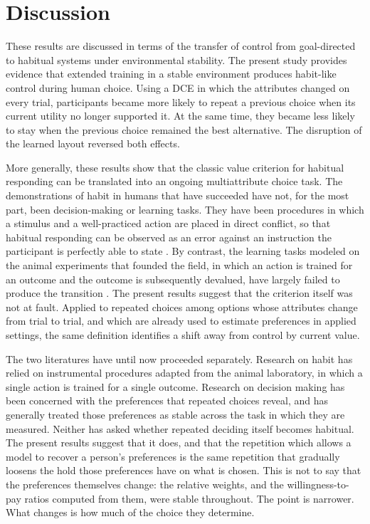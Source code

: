 \documentclass[man,natbib,floatsintext]{apa7}
\begin{document}
\section{Discussion}

These results are discussed in terms of the transfer of control from goal-directed to habitual systems under environmental stability. The present study provides evidence that extended training in a stable environment produces habit-like control during human choice. Using a DCE in which the attributes changed on every trial, participants became more likely to repeat a previous choice when its current utility no longer supported it. At the same time, they became less likely to stay when the previous choice remained the best alternative. The disruption of the learned layout reversed both effects.

More generally, these results show that the classic value criterion for habitual responding can be translated into an ongoing multiattribute choice task. The demonstrations of habit in humans that have succeeded have not, for the most part, been decision-making or learning tasks. They have been procedures in which a stimulus and a well-practiced action are placed in direct conflict, so that habitual responding can be observed as an error against an instruction the participant is perfectly able to state \citep{hardwick2019}.
By contrast, the learning tasks modeled on the animal experiments that founded the field, in which an action is trained for an outcome and the outcome is subsequently devalued, have largely failed to produce the transition \citep{deWit2018,pool2022}. The present results suggest that the criterion itself was not at fault. Applied to repeated choices among options whose attributes change from trial to trial, and which are already used to estimate preferences in applied settings, the same definition identifies a shift away from control by current value.

The two literatures have until now proceeded separately. Research on habit has relied on instrumental procedures adapted from the animal laboratory, in which a single action is trained for a single outcome. Research on decision making has been concerned with the preferences that repeated choices reveal, and has generally treated those preferences as stable across the task in which they are measured. Neither has asked whether repeated deciding itself becomes habitual. The present results suggest that it does, and that the repetition which allows a model to recover a person's preferences is the same repetition that gradually loosens the hold those preferences have on what is chosen. This is not to say that the preferences themselves change: the relative weights, and the willingness-to-pay ratios computed from them, were stable throughout. The point is narrower. What changes is how much of the choice they determine.
\end{document}
